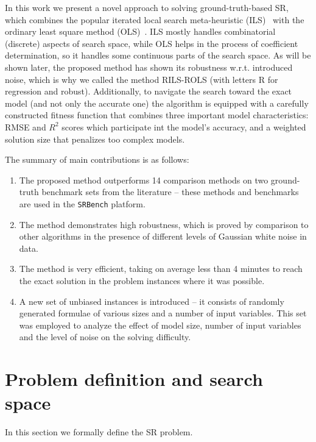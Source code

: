 \documentclass{bmcart}
\begin{document}
In this work we present a novel approach to solving ground-truth-based SR, which combines the popular iterated local search meta-heuristic (ILS)~\cite{lourencco2003iterated,lourencco2010iterated} with the ordinary least square method (OLS)~\cite{leng2007ordinary}. ILS mostly handles combinatorial (discrete) aspects of search space, while OLS helps in the process of coefficient determination, so it handles some continuous parts of the search space. As will be shown later, the proposed method has shown its robustness w.r.t. introduced noise, which is why we called the method \textsc{RILS}-\textsc{ROLS}  (with letters R for regression and robust). Additionally, to navigate the search toward the exact model (and not only the accurate one) the algorithm is equipped with a carefully constructed fitness function that combines three important model characteristics: RMSE and $R^2$ scores which participate int the model's accuracy, and a weighted solution size that penalizes too complex models. 

The summary of main contributions is as follows: 

\begin{enumerate}
	\item The proposed method outperforms 14 comparison methods on two ground-truth benchmark sets from the literature -- these methods and benchmarks are used in the \texttt{SRBench} platform.  
	
	\item The method demonstrates high robustness, which is proved by comparison to other algorithms in the presence of different levels of Gaussian white noise in data. 
	
	\item The method is very efficient, taking on average less than 4 minutes to reach the exact solution in the problem instances where it was possible. 
	
	\item A new set of unbiased instances is introduced -- it consists of randomly generated formulae of various sizes and a number of input variables. This set was employed to analyze the effect of model size, number of input variables and the level of noise on the solving difficulty. 
\end{enumerate}
 
\section{Problem definition and search space}
\label{sec:search-space}
In this section we formally define the SR problem.
\end{document}
